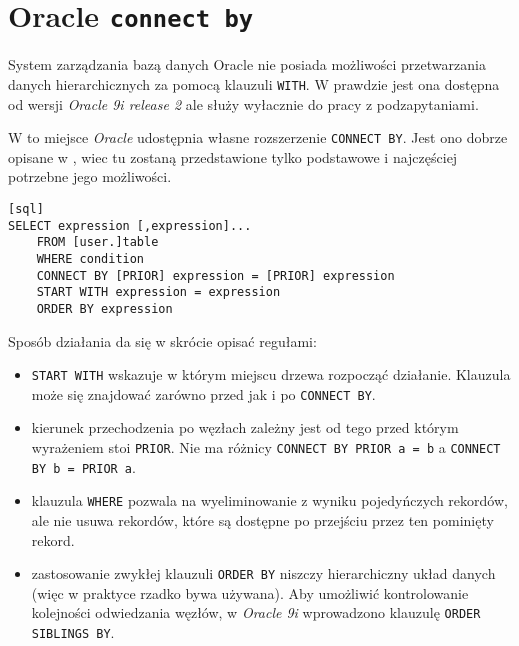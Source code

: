 \section{Oracle \texttt{connect by}}






System zarządzania bazą danych Oracle nie posiada możliwości przetwarzania danych hierarchicznych za pomocą klauzuli \texttt{WITH}.
W prawdzie jest ona dostępna od wersji \emph{Oracle 9i release 2} ale służy wyłacznie do pracy z podzapytaniami.


W to miejsce \emph{Oracle} udostępnia własne rozszerzenie \texttt{CONNECT BY}. 
Jest ono dobrze opisane w \cite{oracle-ref11}, wiec tu zostaną przedstawione tylko podstawowe i najczęściej potrzebne jego możliwości.



\begin{verbatim}[sql]
SELECT expression [,expression]...
    FROM [user.]table
    WHERE condition
    CONNECT BY [PRIOR] expression = [PRIOR] expression
    START WITH expression = expression
    ORDER BY expression
\end{verbatim}


Sposób działania da się w skrócie opisać regułami:
\begin{itemize}
    \item \texttt{START WITH} wskazuje w którym miejscu drzewa rozpocząć działanie. 
        Klauzula może się znajdować zarówno przed jak i po \texttt{CONNECT BY}.
    \item kierunek przechodzenia po węzłach zależny jest od tego przed którym wyrażeniem stoi \texttt{PRIOR}.
         Nie ma różnicy \verb|CONNECT BY PRIOR a = b| a \verb|CONNECT BY b = PRIOR a|.
    \item klauzula \texttt{WHERE} pozwala na wyeliminowanie z wyniku pojedyńczych rekordów, 
        ale nie usuwa rekordów, które są dostępne po przejściu przez ten pominięty rekord.
    \item zastosowanie zwykłej klauzuli \texttt{ORDER BY} niszczy hierarchiczny układ danych 
        (więc w praktyce rzadko bywa używana).
        Aby umożliwić kontrolowanie kolejności odwiedzania węzłów, 
        w \emph{Oracle 9i} wprowadzono klauzulę \texttt{ORDER SIBLINGS BY}.
\end{itemize}


